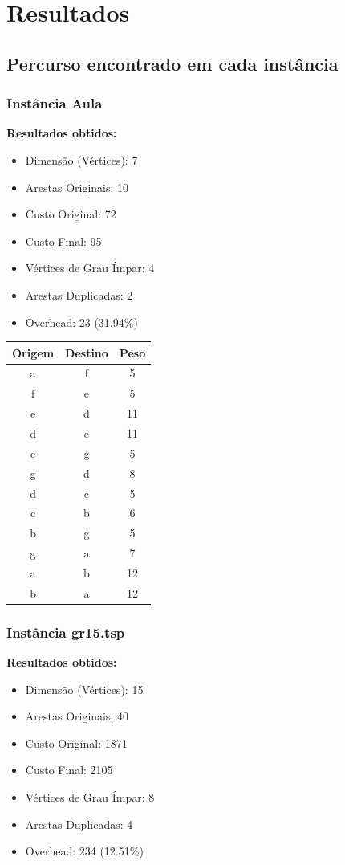 \documentclass[12pt]{article}
\begin{document}
\section{Resultados}

\subsection{Percurso encontrado em cada instância}

\subsubsection{Instância Aula}

\textbf{Resultados obtidos:}
\begin{itemize}
    \item Dimensão (Vértices): 7
    \item Arestas Originais: 10
    \item Custo Original: 72
    \item Custo Final: 95
    \item Vértices de Grau Ímpar: 4
    \item Arestas Duplicadas: 2
    \item Overhead: 23 (31.94\%)
\end{itemize}

\begin{longtable}{|c|c|c|}
\hline Origem & Destino & Peso \\
\hline a & f & 5 \\
\hline f & e & 5 \\
\hline e & d & 11 \\
\hline d & e & 11 \\
\hline e & g & 5 \\
\hline g & d & 8 \\
\hline d & c & 5 \\
\hline c & b & 6 \\
\hline b & g & 5 \\
\hline g & a & 7 \\
\hline a & b & 12 \\
\hline b & a & 12 \\
\hline\end{longtable}

\subsubsection{Instância gr15.tsp}

\textbf{Resultados obtidos:}
\begin{itemize}
    \item Dimensão (Vértices): 15
    \item Arestas Originais: 40
    \item Custo Original: 1871
    \item Custo Final: 2105
    \item Vértices de Grau Ímpar: 8
    \item Arestas Duplicadas: 4
    \item Overhead: 234 (12.51\%)
\end{itemize}
\end{document}
